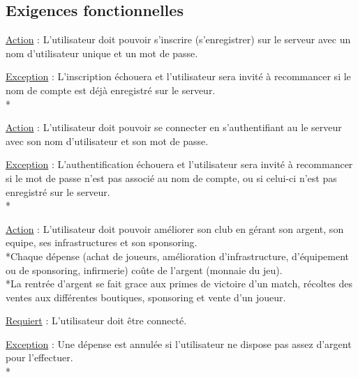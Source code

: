 \documentclass[a4paper]{article}
\begin{document}
	\subsection{Exigences fonctionnelles}
		\begin{description}[style=nextline]
			\item[S'inscrire :]
			\begin{description}[leftmargin=*] %
				\item[]
				\item \underline{Action} : L'utilisateur doit pouvoir s'inscrire (s'enregistrer) sur le serveur avec un nom d'utilisateur unique et un mot de passe.
				\item \underline{Exception} : L'inscription échouera et l'utilisateur sera invité à recommancer si le nom de compte est déjà enregistré sur le serveur.\\*
			\end{description} %
			
			\item[Se connecter :]
			\begin{description}[leftmargin=*] %
				\item[]
				\item \underline{Action} : L'utilisateur doit pouvoir se connecter en s'authentifiant au le serveur avec son nom d'utilisateur et son mot de passe.
				\item \underline{Exception} : L'authentification échouera et l'utilisateur sera invité à recommancer si le mot de passe n'est pas associé au nom de compte, ou si celui-ci n'est pas enregistré sur le serveur.\\*
			\end{description} %
			
			\item[Gérer le club (phase management) :]
			\begin{description}[leftmargin=*] %
				\item[]
				\item \underline{Action} : L'utilisateur doit pouvoir améliorer son \gls{club} en gérant son argent, son \gls{equipe}, ses infrastructures et son sponsoring.\\*Chaque dépense (achat de joueurs, amélioration d'infrastructure, d'équipement ou de sponsoring, infirmerie) coûte de l'argent (monnaie du jeu).\\*La rentrée d'argent se fait grace aux primes de victoire d'un match, récoltes des ventes aux différentes boutiques, sponsoring et vente d'un joueur.
				\item \underline{Requiert} : L'utilisateur doit être connecté.
				\item \underline{Exception} : Une dépense est annulée si l'utilisateur ne dispose pas assez d'argent pour l'effectuer.\\*
			\end{description} %
			

\end{description}
\end{document}
